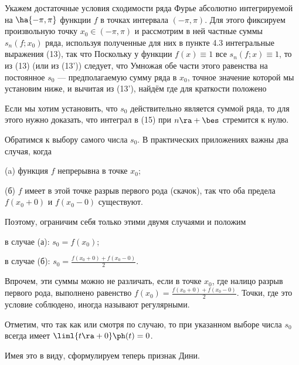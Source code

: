 \documentclass[a4paper]{article}
\begin{document}
Укажем достаточные условия сходимости ряда Фурье абсолютно
интегрируемой на $\ha{-\pi,\pi}$ функции $f$ в точках интервала
$(-\pi,\pi)$. Для этого фиксируем произвольную точку
$x_0\in(-\pi,\pi)$ и рассмотрим в ней частные суммы $s_n(f;x_0)$
ряда, используя полученные для них в пункте 4.3 интегральные
выражения (13), так что  Поскольку у функции $f(x)\equiv1$ все
$s_n(f;x)\equiv1$, то из (13) (или из (13')) следует, что  Умножая обе части этого равенства на постоянное
$s_0$ --- предполагаемую сумму ряда в $x_0$, точное значение которой
мы установим ниже, и вычитая из (13'), найдём  где для краткости
положено 

Если мы хотим установить, что $s_0$ действительно является суммой
ряда, то для этого нужно доказать, что интеграл в (15) при
$n\ra+\bes$ стремится к нулю.

Обратимся к выбору самого числа $s_0$. В практических приложениях
важны два случая, когда \begin{items}{-2} \item (a) функция $f$
непрерывна в точке $x_0$; \item (б) $f$ имеет в этой точке разрыв
первого рода (скачок), так что оба предела $f(x_0+0)$ и $f(x_0-0)$
существуют.
\end{items} Поэтому, ограничим себя только этими двумя случаями и
положим \begin{items}{-2}\item в случае (а): $s_0=f(x_0)$; \item в
случае (б): $s_0 = \frac{f(x_0+0)+f(x_0-0)}2$.
\end{items}

Впрочем, эти суммы можно не различать, если в точке $x_0$, где
налицо разрыв первого рода, выполнено равенство $f(x_0) =
\frac{f(x_0+0) + f(x_0-0)}2$. Точки, где это условие соблюдено,
иногда называют регулярными.

Отметим, что так как  или
 смотря по случаю,
то при указанном выборе числа $s_0$ всегда имеет $\liml{t\ra+0}
\ph(t)=0$.

Имея это в виду, сформулируем теперь признак Дини.
\end{document}
